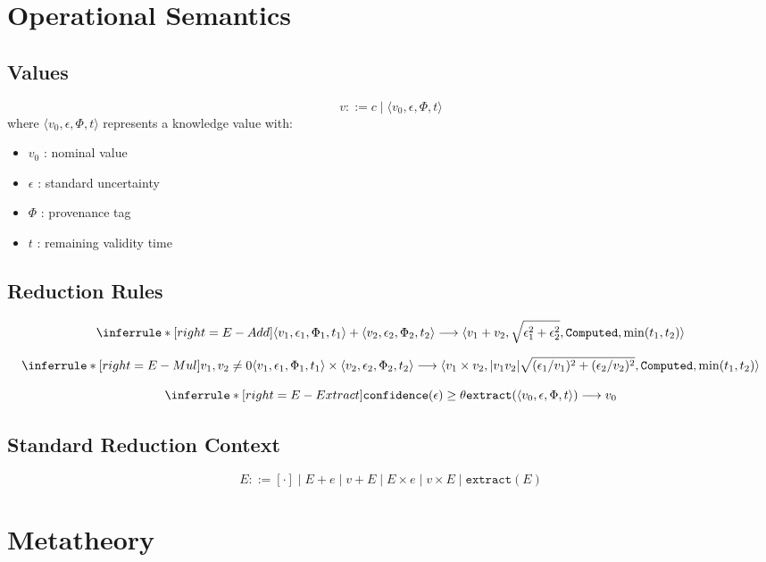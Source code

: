 \documentclass[11pt]{article}
\begin{document}
\section{Operational Semantics}

\subsection{Values}
\[
v ::= c \mid \langle v_0, \epsilon, \Phi, t \rangle
\]
where $\langle v_0, \epsilon, \Phi, t \rangle$ represents a knowledge value with:
\begin{itemize}
\item $v_0$ : nominal value
\item $\epsilon$ : standard uncertainty
\item $\Phi$ : provenance tag
\item $t$ : remaining validity time
\end{itemize}

\subsection{Reduction Rules}
\[
\inferrule*[right=E-Add]
  { }
  {\langle v_1, \epsilon_1, \Phi_1, t_1 \rangle + \langle v_2, \epsilon_2, \Phi_2, t_2 \rangle \longrightarrow
   \langle v_1 + v_2, \sqrt{\epsilon_1^2 + \epsilon_2^2}, \texttt{Computed}, \min(t_1, t_2) \rangle}
\]

\[
\inferrule*[right=E-Mul]
  {v_1, v_2 \neq 0}
  {\langle v_1, \epsilon_1, \Phi_1, t_1 \rangle \times \langle v_2, \epsilon_2, \Phi_2, t_2 \rangle \longrightarrow \\
   \langle v_1 \times v_2, |v_1 v_2| \sqrt{(\epsilon_1/v_1)^2 + (\epsilon_2/v_2)^2}, \texttt{Computed}, \min(t_1, t_2) \rangle}
\]

\[
\inferrule*[right=E-Extract]
  {\texttt{confidence}(\epsilon) \geq \theta}
  {\texttt{extract}(\langle v_0, \epsilon, \Phi, t \rangle) \longrightarrow v_0}
\]

\subsection{Standard Reduction Context}
\[
E ::= [\cdot] \mid E + e \mid v + E \mid E \times e \mid v \times E \mid \texttt{extract}(E)
\]

\section{Metatheory}
\end{document}
